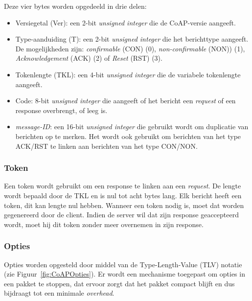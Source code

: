 Deze vier bytes worden opgedeeld in drie delen:
\begin{itemize}
\item Versiegetal (Ver): een 2-bit \textit{unsigned integer} die de CoAP-versie aangeeft. 
\item Type-aanduiding (T): een 2-bit \textit{unsigned integer} die het berichttype aangeeft. De mogelijkheden zijn: \textit{confirmable} (CON)  (0), \textit{non-confirmable} (NON))  (1), \textit{Acknowledgement} (ACK)  (2) of \textit{Reset} (RST)  (3).
\item Tokenlengte (TKL): een 4-bit \textit{unsigned integer} die de variabele tokenlengte aangeeft.
\item Code: 8-bit \textit{unsigned integer} die aangeeft of het bericht een \textit{request} of een response overbrengt, of leeg is.
\item \textit{message-ID}: een 16-bit \textit{unsigned integer} die gebruikt wordt om duplicatie van berichten op te merken. Het wordt ook gebruikt om berichten van het type ACK/RST te linken aan berichten van het type CON/NON.
\end{itemize}

\subsubsection{Token}

Een token wordt gebruikt om een response te linken aan een \textit{request}. De lengte wordt bepaald door de TKL en is nul tot acht bytes lang. Elk bericht heeft een token, dit kan lengte nul hebben. Wanneer een token nodig is, moet dat worden gegenereerd door de client. Indien de server wil dat zijn response geaccepteerd wordt, moet hij dit token zonder meer overnemen in zijn response.

\subsubsection{Opties}

Opties worden opgesteld door middel van de Type-Length-Value (TLV) notatie (zie Figuur~\ref{fig:CoAPOpties}). Er wordt een mechanisme toegepast om opties in een pakket te stoppen, dat ervoor zorgt dat het pakket compact blijft en dus bijdraagt tot een minimale \textit{overhead}.\\

